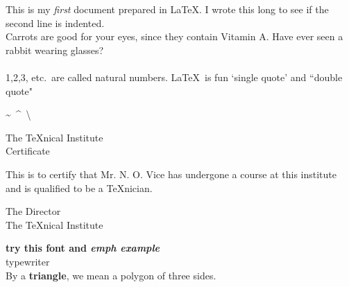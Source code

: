\documentclass{article}
\begin{document}
	This is my \emph{first} document prepared in \LaTeX. I wrote this long to see if the second line is indented. \\[10pt]
	\noindent Carrots are good for your eyes, since they contain Vitamin A\@. Have ever seen a rabbit wearing glasses?\\\\
	1,2,3, etc.\ are called natural numbers. 
	\LaTeX\ is fun
	`single quote' and ``double quote"
	
	\textasciitilde\ \textasciicircum\ \textbackslash\ 
	\begin{center}
		The \TeX nical Institute\\[.75cm]
		Certificate		
	\end{center}
	\noindent This is to certify that Mr. N. O. Vice has undergone a course at this institute and is qualified to be a \TeX nician.
	\begin{flushright}
		The Director\\
		The \TeX nical Institute
	\end{flushright}
	\textbf{try this font and \textit{emph example}}\\
	{\ttfamily typewriter}\\
	By a {\bfseries triangle}, we mean a polygon of three sides.
\end{document}
